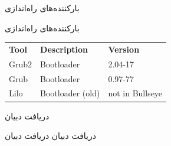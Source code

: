 \documentclass[hyperref={colorlinks}]{beamer}
\begin{document}
\begin{persian}
\begin{frame}{بارکننده‌های راه‌اندازی}
\begin{block}{بارکننده‌های راه‌اندازی}
\vspace{0.5cm}


\begin{latin}
\begin{tabular}{lll} 
\textbf{Tool} & \textbf{Description} & \textbf{Version} \\
Grub2 & Bootloader & 2.04-17 \\
Grub & Bootloader & 0.97-77 \\
Lilo & Bootloader (old) & not in Bullseye \\
\end{tabular}
\end{latin}

\end{block}
\end{frame}
\end{persian}
\begin{persian}
\begin{frame}{دریافت دبیان}
\begin{block}{دریافت دبیان}
دریافت دبیان
\end{block}
\end{frame}
\end{persian}
\end{document}
